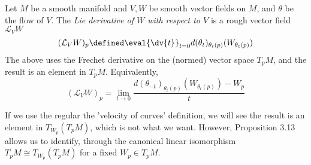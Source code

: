 \documentclass[../main-v2-manifolds.tex]{subfiles}
\begin{document}
\providecommand{\szz}{\mathcal{S}}
\providecommand{\ccinf}{C_c^\infty}

\providecommand{\Taux}{\Tau_\xx}
\providecommand{\Tauy}{\Tau_\yy}
\providecommand{\Tauxy}{\Tau_{\xx\times\yy}}

\providecommand{\Bx}{\borel_\xx}
\providecommand{\By}{\borel_\yy}
\providecommand{\Bxy}{\borel_{\xx\times\yy}}




\begin{definition}\label{lee-chp9:lie-derivative-definition}
    Let $M$ be a smooth manifold and $V, W$ be smooth vector fields on $M$, and $\theta$ be the flow of $V$. The \emph{Lie derivative of $W$ with respect to $V$} is a rough vector field $\mathcal{L}_V W$
    \begin{equation}\label{lie-derivative-def-1-vector}
        (\mathcal{L}_V W)_p \defined \eval{\dv{t}}_{t=0} d(\theta_t)_{\theta_t(p)}(W_{\theta_t(p)})
    \end{equation}
    The above uses the Frechet derivative on the (normed) vector space $T_p M$, and the result is an element in $T_p M$. Equivalently,
    \begin{equation}\label{lie-derivative-def-2-vector}
        (\mathcal{L}_V W)_p = \lim_{t\to 0}\dfrac{d(\theta_{-t})_{\theta_t (p)}(W_{\theta_t(p)}) - W_p}{t}
    \end{equation}
\end{definition}
\begin{remark}
    If we use the regular the 'velocity of curves' definition, we will see the result is an element in $T_{W_p}(T_pM)$, which is not what we want. However, Proposition 3.13 allows us to identify, through the canonical linear isomorphism $T_pM\cong T_{W_{p}}(T_p M)$ for a fixed $W_p\in T_pM$.
\end{remark}
\end{document}
